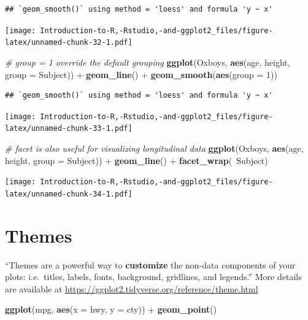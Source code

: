 \documentclass[]{book}
\newenvironment{Shaded}{\begin{snugshade}}{\end{snugshade}}
\newcommand{\KeywordTok}[1]{\textcolor[rgb]{0.13,0.29,0.53}{\textbf{{#1}}}}
\newcommand{\DataTypeTok}[1]{\textcolor[rgb]{0.13,0.29,0.53}{{#1}}}
\newcommand{\DecValTok}[1]{\textcolor[rgb]{0.00,0.00,0.81}{{#1}}}
\newcommand{\StringTok}[1]{\textcolor[rgb]{0.31,0.60,0.02}{{#1}}}
\newcommand{\CommentTok}[1]{\textcolor[rgb]{0.56,0.35,0.01}{\textit{{#1}}}}
\newcommand{\NormalTok}[1]{{#1}}
\begin{document}
\begin{verbatim}
## `geom_smooth()` using method = 'loess' and formula 'y ~ x'
\end{verbatim}

\texttt{[image: Introduction-to-R,-Rstudio,-and-ggplot2\_files/figure-latex/unnamed-chunk-32-1.pdf]}

\begin{Shaded}
\begin{Highlighting}[]
\CommentTok{# group = 1 override the default grouping }
\KeywordTok{ggplot}\NormalTok{(Oxboys, }\KeywordTok{aes}\NormalTok{(age, height, }\DataTypeTok{group =} \NormalTok{Subject)) +}\StringTok{ }\KeywordTok{geom_line}\NormalTok{() +}\StringTok{ }\KeywordTok{geom_smooth}\NormalTok{(}\KeywordTok{aes}\NormalTok{(}\DataTypeTok{group =} \DecValTok{1}\NormalTok{))}
\end{Highlighting}
\end{Shaded}

\begin{verbatim}
## `geom_smooth()` using method = 'loess' and formula 'y ~ x'
\end{verbatim}

\texttt{[image: Introduction-to-R,-Rstudio,-and-ggplot2\_files/figure-latex/unnamed-chunk-33-1.pdf]}

\begin{Shaded}
\begin{Highlighting}[]
\CommentTok{# facet is also useful for visualizing longitudinal data}
\KeywordTok{ggplot}\NormalTok{(Oxboys, }\KeywordTok{aes}\NormalTok{(age, height, }\DataTypeTok{group =} \NormalTok{Subject)) +}\StringTok{ }\KeywordTok{geom_line}\NormalTok{() +}\StringTok{ }\KeywordTok{facet_wrap}\NormalTok{(~Subject)}
\end{Highlighting}
\end{Shaded}

\texttt{[image: Introduction-to-R,-Rstudio,-and-ggplot2\_files/figure-latex/unnamed-chunk-34-1.pdf]}

\section{Themes}\label{themes}

``Themes are a powerful way to \textbf{customize} the non-data
components of your plots: i.e.~titles, labels, fonts, background,
gridlines, and legends.'' More details are available at
\url{https://ggplot2.tidyverse.org/reference/theme.html}

\begin{Shaded}
\begin{Highlighting}[]
\KeywordTok{ggplot}\NormalTok{(mpg, }\KeywordTok{aes}\NormalTok{(}\DataTypeTok{x =} \NormalTok{hwy, }\DataTypeTok{y =} \NormalTok{cty)) +}\StringTok{ }\KeywordTok{geom_point}\NormalTok{() }
\end{Highlighting}
\end{Shaded}
\end{document}

